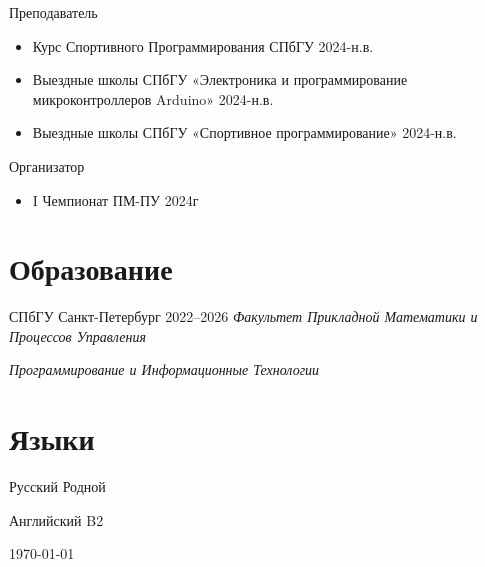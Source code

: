 \documentclass{cv}
\begin{document}
\begin{cvblock}{Преподаватель}
    \begin{itemize}
        \item Курс Спортивного Программирования СПбГУ 2024-н.в.
        \item Выездные школы СПбГУ «Электроника и программирование микроконтроллеров Arduino» 2024-н.в.
        \item Выездные школы СПбГУ «Спортивное программирование» 2024-н.в.
    \end{itemize}
\end{cvblock}

\begin{cvblock}{Организатор}
    \begin{itemize}
        \item I Чемпионат ПМ-ПУ 2024г
    \end{itemize}
\end{cvblock}

\section{Образование}

\begin{cvblock}{%
    \blocktitle
        {СПбГУ}
        {Санкт-Петербург}
        {}
        {2022--2026}
    }
    \textit{Факультет Прикладной Математики и Процессов Управления}
    \vspace{1em}

    \textit{Программирование и Информационные Технологии}
\end{cvblock}

\section{Языки}

\begin{cvblock}{Русский}
	Родной
\end{cvblock}

\begin{cvblock}{Английский}
	B2
\end{cvblock}

\vfill

\begin{center}
	\monthyear\today
\end{center}
\end{document}
